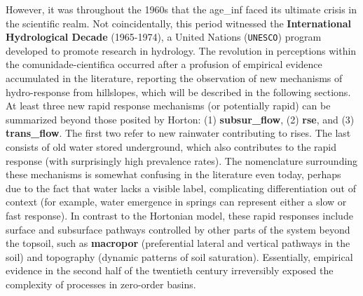 \documentclass[./main_en.tex]{subfiles}
\begin{document}
\par However, it was throughout the 1960s that the \gls{age_inf} faced its ultimate crisis in the scientific realm. Not coincidentally, this period witnessed the \textbf{International Hydrological Decade} (1965-1974), a United Nations (\texttt{UNESCO}) program developed to promote research in \gls{hydrology}. The revolution in perceptions within the \gls{comunidade-cientifica} occurred after a profusion of empirical evidence accumulated in the literature, reporting the observation of new mechanisms of \gls{hydro-response} from hillslopes, which will be described in the following sections. At least three new rapid response mechanisms (or potentially rapid) can be summarized beyond those posited by Horton: (1) \textbf{\gls{subsur_flow}}, (2) \textbf{\gls{rse}}, and (3) \textbf{\gls{trans_flow}}. The first two refer to new rainwater contributing to rises. The last consists of old water stored underground, which also contributes to the rapid response (with surprisingly high prevalence rates). The nomenclature surrounding these mechanisms is somewhat confusing in the literature even today, perhaps due to the fact that water lacks a visible label, complicating differentiation out of context (for example, water emergence in springs can represent either a slow or fast response). In contrast to the Hortonian \gls{model}, these rapid responses include surface and subsurface pathways controlled by other parts of the \gls{system} beyond the topsoil, such as \textbf{\gls{macropor}} (preferential lateral and vertical pathways in the soil) and topography (dynamic patterns of soil saturation). Essentially, empirical evidence in the second half of the twentieth century irreversibly exposed the complexity of processes in zero-order basins.
\end{document}
